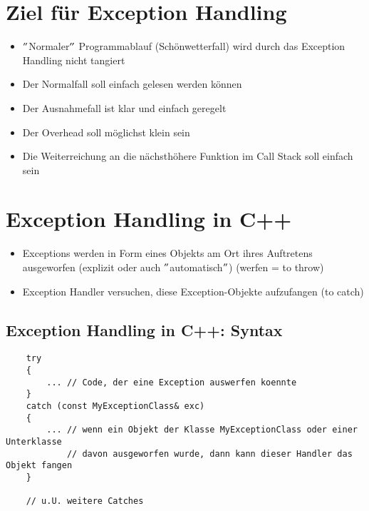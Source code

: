 \section{Ziel für Exception Handling}
\label{sec:Ziel für Exception Handling}
\begin{itemize}
	\item $"$Normaler$"$ Programmablauf (Schönwetterfall) wird durch das Exception Handling nicht tangiert
	\item Der Normalfall soll einfach gelesen werden können
	\item Der Ausnahmefall ist klar und einfach geregelt
	\item Der Overhead soll möglichst klein sein
	\item Die Weiterreichung an die nächsthöhere Funktion im Call Stack soll einfach sein
\end{itemize}

\section{Exception Handling in C++}
\label{sec:Exception Handling in C++}
\begin{itemize}
	\item Exceptions werden in Form eines Objekts am Ort ihres Auftretens ausgeworfen (explizit oder auch $"$automatisch$"$) (werfen = to throw)
	\item Exception Handler versuchen, diese Exception-Objekte aufzufangen (to catch)
\end{itemize}

\subsection{Exception Handling in C++: Syntax}
\label{sec:Exception Handling in C++: Syntax}
\noindent
\begin{minipage}{\linewidth}
	\begin{lstlisting}
	try
	{
		... // Code, der eine Exception auswerfen koennte
	}
	catch (const MyExceptionClass& exc)
	{
		... // wenn ein Objekt der Klasse MyExceptionClass oder einer Unterklasse
			// davon ausgeworfen wurde, dann kann dieser Handler das Objekt fangen
	}
	
	// u.U. weitere Catches
	\end{lstlisting}
\end{minipage}

